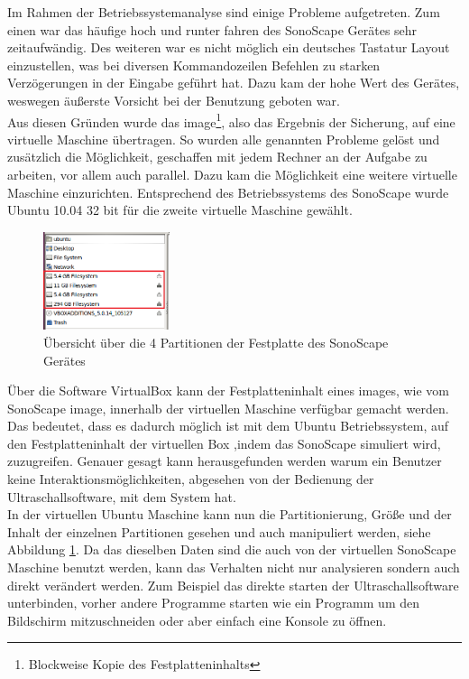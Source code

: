Im Rahmen der Betriebssystemanalyse sind einige Probleme aufgetreten. Zum einen war das häufige hoch und runter fahren des SonoScape Gerätes sehr zeitaufwändig. Des weiteren war es nicht möglich ein deutsches Tastatur Layout einzustellen, was bei diversen Kommandozeilen Befehlen zu starken Verzögerungen in der Eingabe geführt hat. Dazu kam der hohe Wert des Gerätes, weswegen äußerste Vorsicht bei der Benutzung geboten war.\\
Aus diesen Gründen wurde das image\footnote{Blockweise Kopie des Festplatteninhalts}, also das Ergebnis der Sicherung, auf eine virtuelle Maschine übertragen. So wurden alle genannten Probleme gelöst und zusätzlich die Möglichkeit, geschaffen mit jedem Rechner an der Aufgabe zu arbeiten, vor allem auch parallel. Dazu kam die Möglichkeit eine weitere virtuelle Maschine einzurichten. Entsprechend des Betriebssystems des SonoScape wurde Ubuntu 10.04 32 bit für die zweite virtuelle Maschine gewählt.\\
\begin{figure}
\vspace{-19pt}
\centering
\includegraphics*[width =0.33\textwidth]{Sonoscape_Analyse/Anzahl_Festplatten}
\caption{{\small Übersicht über die 4 Partitionen der Festplatte des SonoScape Gerätes}}
\label{fig:Festplatte}
\end{figure}
Über die Software VirtualBox kann der Festplatteninhalt eines images, wie vom SonoScape image, innerhalb der virtuellen Maschine verfügbar gemacht werden. Das bedeutet, dass es dadurch möglich ist mit dem Ubuntu Betriebssystem, auf den Festplatteninhalt der virtuellen Box ,indem das SonoScape simuliert wird, zuzugreifen. Genauer gesagt kann herausgefunden werden warum ein Benutzer keine Interaktionsmöglichkeiten, abgesehen von der Bedienung der Ultraschallsoftware, mit dem System hat.\\
In der virtuellen Ubuntu Maschine kann nun die Partitionierung, Größe und der Inhalt der einzelnen Partitionen gesehen und auch manipuliert werden, siehe Abbildung \ref{fig:Festplatte}. Da das dieselben Daten sind die auch von der virtuellen SonoScape Maschine benutzt werden, kann das Verhalten nicht nur analysieren sondern auch direkt verändert werden.
Zum Beispiel das direkte starten der Ultraschallsoftware unterbinden, vorher andere Programme starten wie ein Programm um den Bildschirm mitzuschneiden oder aber einfach eine Konsole zu öffnen.

